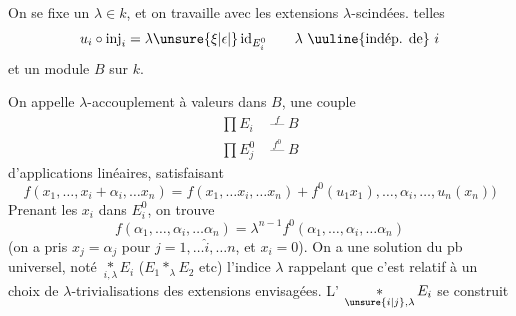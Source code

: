 On se fixe un $\lambda\in k$, et on
travaille avec les extensions $\lambda$-scindées.
   telles
\[
u_i\circ\mathrm{inj}_i=\lambda\unsure{\xi|\epsilon|{}}\,\mathrm{id}_{E_i^0}
\qquad \lambda\ \text{\uuline{indép. de} }i
\]
et un module $B$\unsure{,} sur $k$. 

On appelle $\lambda$-accouplement à valeurs
dans $B$, une couple
\[
\begin{aligned}
\prod E_i &\mathrel{\mathop{\text{---}}\limits^{f}} B\\
\prod E_j^0 &\mathrel{\mathop{\text{---}}\limits^{f^0}} B
\end{aligned}
\]
d'applications  linéaires, satisfaisant
\[
f(x_1,\ldots,x_i+\alpha_i,\ldots x_n)
=f(x_1,\ldots x_i,\ldots x_n)+f^0(u_1x_1),\ldots,\alpha_i,\ldots,u_n(x_n))
\]
Prenant les $x_i$ dans $E_i^0$, on trouve
\[
f(\alpha_1,\ldots,\alpha_i,\ldots\alpha_n)=\lambda^{n-1}f^0(\alpha_1,\ldots,\alpha_i,\ldots\alpha_n)
\]
(on a pris $x_j=\alpha_j$ pour $j=1,\ldots\hat i,\ldots n$, et
$x_i=0$). On a une solution du
pb universel, noté $\mathop{*}\limits_{i,\lambda}E_i$ ($E_1*_\lambda E_2$ etc)
l'indice $\lambda$ rappelant que c'est relatif à un
choix de $\lambda$-trivialisations des extensions
envisagées. L' $\mathop{*}\limits_{\unsure{i|j},\lambda}E_i$ se construit
